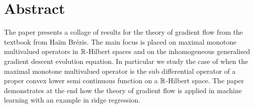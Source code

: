 \section{Abstract}
The paper presents a collage of results for the theory of gradient flow
from the textbook \cite{brezis1973ope} from Haïm Brézis.
The main focus is placed on maximal monotone multivalued
operators in $ \mathbb{R} $-Hilbert spaces and on the
inhomogeneous generalised gradient descent evolution
equation. In particular we study the case of when
the maximal monotone multivalued operator is the sub differential
operator of a proper convex lower semi continuous function 
on a $ \mathbb{R} $-Hilbert space.
The paper demonstrates at the end how the theory of gradient flow
is applied in machine learning with an example
in ridge regression. 